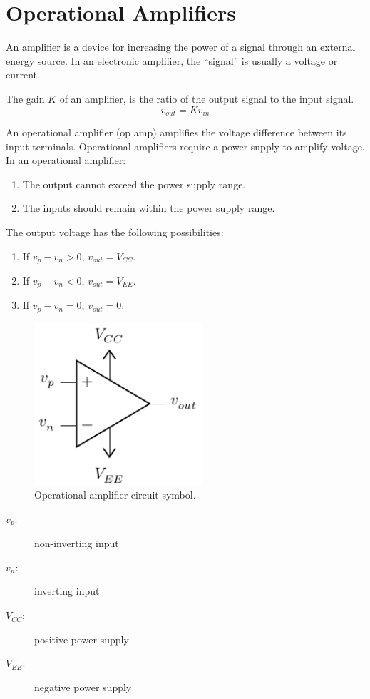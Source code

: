 \documentclass{article}
\begin{document}
\section{Operational Amplifiers}
\begin{definition}[Amplifier]
    An amplifier is a device for increasing the power of a signal through an external energy source.
    In an electronic amplifier, the ``signal'' is usually a voltage or current.
\end{definition}
\begin{definition}[Gain]
    The gain \(K\) of an amplifier, is the ratio of the output signal to the input signal.
    \begin{equation*}
        v_{out} = K v_{in}
    \end{equation*}
\end{definition}
\begin{definition}
    An operational amplifier (op amp) amplifies the voltage difference between its input terminals.
    Operational amplifiers require a power supply to amplify voltage.
    In an operational amplifier:
    \begin{enumerate}
        \item The output cannot exceed the power supply range.
        \item The inputs should remain within the power supply range.
    \end{enumerate}
    The output voltage has the following possibilities:
    \begin{enumerate}
        \item If \(v_p - v_n > 0\), \(v_{out} = V_{CC}\).
        \item If \(v_p - v_n < 0\), \(v_{out} = V_{EE}\).
        \item If \(v_p - v_n = 0\), \(v_{out} = 0\).
    \end{enumerate}
    \begin{figure}[H]
        \centering
        \includegraphics[height = 6cm, keepaspectratio = true]{figures/operational_amplifier.pdf}
        \caption{Operational amplifier circuit symbol.}
    \end{figure}
    \begin{description}
        \item[\(v_p\):] non-inverting input
        \item[\(v_n\):] inverting input
        \item[\(V_{CC}\):] positive power supply
        \item[\(V_{EE}\):] negative power supply
    \end{description}
\end{definition}
\end{document}
